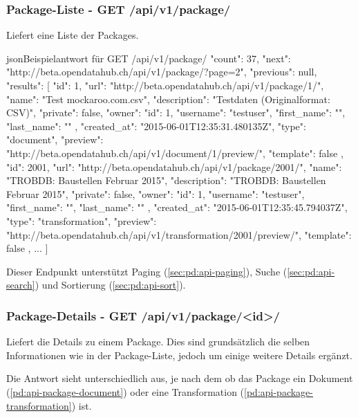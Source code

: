 \subsubsection{Package-Liste - GET /api/v1/package/}\label{sec:pd:api-package-list}
Liefert eine Liste der Packages.

\begin{srclst}{json}{Beispielantwort für GET /api/v1/package/}
{
    "count": 37, 
    "next": "http://beta.opendatahub.ch/api/v1/package/?page=2", 
    "previous": null, 
    "results": [
        {
            "id": 1, 
            "url": "http://beta.opendatahub.ch/api/v1/package/1/", 
            "name": "Test mockaroo.com.csv", 
            "description": "Testdaten (Originalformat: CSV)", 
            "private": false, 
            "owner": {
                "id": 1, 
                "username": "testuser", 
                "first_name": "", 
                "last_name": ""
            }, 
            "created_at": "2015-06-01T12:35:31.480135Z", 
            "type": "document", 
            "preview": "http://beta.opendatahub.ch/api/v1/document/1/preview/", 
            "template": false
        }, 
        {
            "id": 2001, 
            "url": "http://beta.opendatahub.ch/api/v1/package/2001/", 
            "name": "TROBDB: Baustellen Februar 2015", 
            "description": "TROBDB: Baustellen Februar 2015", 
            "private": false, 
            "owner": {
                "id": 1, 
                "username": "testuser", 
                "first_name": "", 
                "last_name": ""
            }, 
            "created_at": "2015-06-01T12:35:45.794037Z", 
            "type": "transformation", 
            "preview": "http://beta.opendatahub.ch/api/v1/transformation/2001/preview/", 
            "template": false
        },
        ...
    ]
}
\end{srclst}

Dieser Endpunkt unterstützt Paging (\cref{sec:pd:api-paging}), Suche (\cref{sec:pd:api-search}) und Sortierung (\cref{sec:pd:api-sort}).

\subsubsection{Package-Details - GET /api/v1/package/<id>/}\label{sec:pd:api-package-details}
Liefert die Details zu einem Package. Dies sind grundsätzlich die selben Informationen wie in der Package-Liste, jedoch um einige weitere Details ergänzt.

Die Antwort sieht unterschiedlich aus, je nach dem ob das Package ein Dokument (\cref{pd:api-package-document}) oder eine Transformation (\cref{pd:api-package-transformation}) ist.

